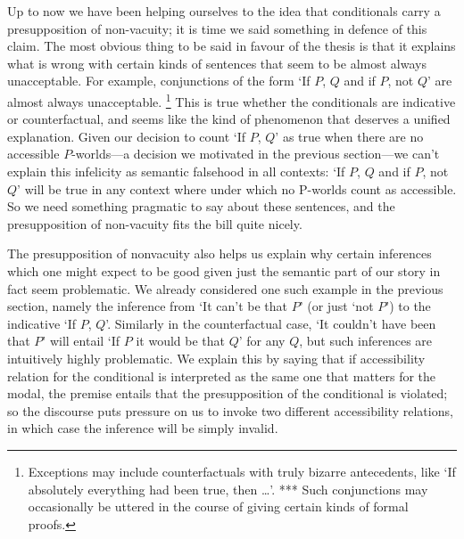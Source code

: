 \documentclass[If.tex]{subfiles}
\begin{document}
Up to now we have been helping ourselves to the idea that conditionals carry a presupposition of non-vacuity; it is time we said something in defence of this claim. The most obvious thing to be said in favour of the thesis is that it explains what is wrong with certain kinds of sentences that seem to be almost always unacceptable. For example, conjunctions of the form ‘If $P$, $Q$ and if $P$, not $Q$’ are almost always unacceptable.%
\footnote{Exceptions may include counterfactuals with truly bizarre antecedents, like ‘If absolutely everything had been true, then …’.   *** Such conjunctions may occasionally be uttered in the course of giving certain kinds of formal proofs.  } 
This is true whether the conditionals are indicative or counterfactual, and seems like the kind of phenomenon that deserves a unified explanation. Given our decision to count ‘If $P$, $Q$’ as true when there are no accessible $P$-worlds---a decision we motivated in the previous section---we can't explain this infelicity as semantic falsehood in all contexts: ‘If $P$, $Q$ and if $P$, not $Q$’ will be true in any context where under which no P-worlds count as accessible. So we need something pragmatic to say about these sentences, and the presupposition of non-vacuity fits the bill quite nicely.

The presupposition of nonvacuity also helps us explain why certain inferences which one might expect to be good given just the semantic part of our story in fact seem problematic. We already considered one such example in the previous section, namely the inference from ‘It can't be that $P$’ (or just ‘not $P$’) to the indicative ‘If $P$, $Q$’. Similarly in the counterfactual case, ‘It couldn't have been that $P$’ will entail ‘If $P$ it would be that $Q$’ for any $Q$, but such inferences are intuitively highly problematic.  We explain this by saying that if accessibility relation for the conditional is interpreted as the same one that matters for the modal, the premise entails that the presupposition of the conditional is violated; so the discourse puts pressure on us to invoke two different accessibility relations, in which case the inference will be simply invalid.
\end{document}
